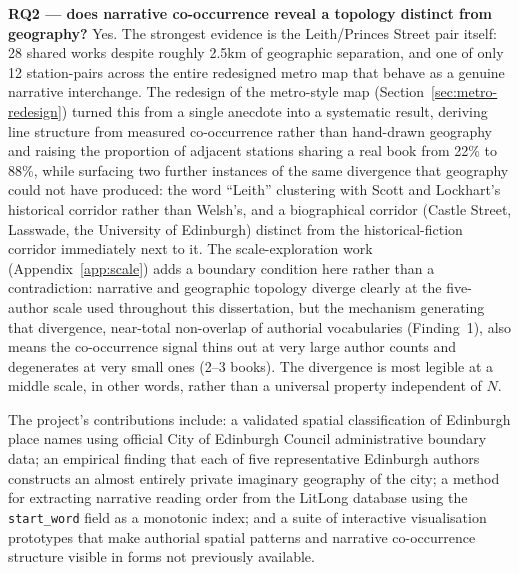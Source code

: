 \documentclass[logo,msc]{infthesis}
\begin{document}
\textbf{RQ2 --- does narrative co-occurrence reveal a topology distinct from geography?} Yes. The strongest evidence is the Leith/Princes Street pair itself: 28 shared works despite roughly 2.5km of geographic separation, and one of only 12 station-pairs across the entire redesigned metro map that behave as a genuine narrative interchange. The redesign of the metro-style map (Section~\ref{sec:metro-redesign}) turned this from a single anecdote into a systematic result, deriving line structure from measured co-occurrence rather than hand-drawn geography and raising the proportion of adjacent stations sharing a real book from 22\% to 88\%, while surfacing two further instances of the same divergence that geography could not have produced: the word ``Leith'' clustering with Scott and Lockhart's historical corridor rather than Welsh's, and a biographical corridor (Castle Street, Lasswade, the University of Edinburgh) distinct from the historical-fiction corridor immediately next to it. The scale-exploration work (Appendix~\ref{app:scale}) adds a boundary condition here rather than a contradiction: narrative and geographic topology diverge clearly at the five-author scale used throughout this dissertation, but the mechanism generating that divergence, near-total non-overlap of authorial vocabularies (Finding~1), also means the co-occurrence signal thins out at very large author counts and degenerates at very small ones (2--3 books). The divergence is most legible at a middle scale, in other words, rather than a universal property independent of $N$.

 
The project's contributions include: a validated spatial classification of Edinburgh place names using official City of Edinburgh Council administrative boundary data; an empirical finding that each of five representative Edinburgh authors constructs an almost entirely private imaginary geography of the city; a method for extracting narrative reading order from the LitLong database using the \texttt{start\_word} field as a monotonic index; and a suite of interactive visualisation prototypes that make authorial spatial patterns and narrative co-occurrence structure visible in forms not previously available.
 
\end{document}
